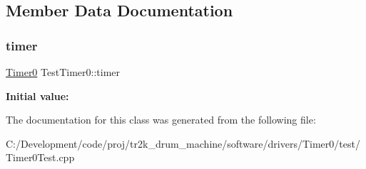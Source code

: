 \subsection{Member Data Documentation}
\mbox{\label{class_test_timer0_a90dac1cc2a8a41c22f76fc0dd169ab67}} 
\subsubsection{\texorpdfstring{timer}{timer}}
{\footnotesize\ttfamily \mbox{\hyperlink{class_timer0}{Timer0}} Test\+Timer0\+::timer}

{\bfseries Initial value\+:}
\begin{DoxyCode}{0}

\end{DoxyCode}


The documentation for this class was generated from the following file\+:\begin{DoxyCompactItemize}
\item 
C\+:/\+Development/code/proj/tr2k\+\_\+drum\+\_\+machine/software/drivers/\+Timer0/test/Timer0\+Test.\+cpp\end{DoxyCompactItemize}
